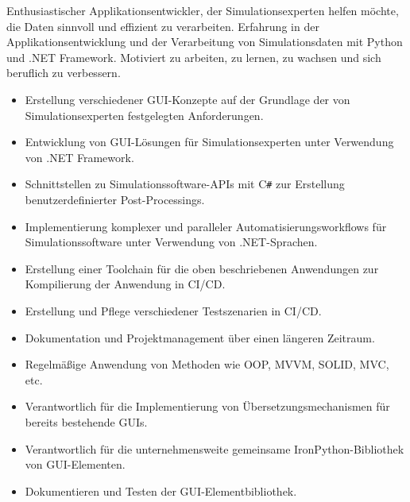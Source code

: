 \documentclass[10pt,a4paper,ragged2e,withhyper]{altacv}
\begin{document}
\begin{paracol}{2}

\begin{flushleft}
Enthusiastischer Applikationsentwickler, der Simulationsexperten helfen möchte, die Daten sinnvoll und effizient zu verarbeiten. 
Erfahrung in der Applikationsentwicklung und der Verarbeitung von Simulationsdaten mit Python und .NET Framework. 
Motiviert zu arbeiten, zu lernen, zu wachsen und sich beruflich zu verbessern.
\end{flushleft}

\begin{itemize}
\item Erstellung verschiedener GUI-Konzepte auf der Grundlage der von Simulationsexperten festgelegten Anforderungen.
\item Entwicklung von GUI-Lösungen für Simulationsexperten unter Verwendung von .NET Framework.
\item Schnittstellen zu Simulationssoftware-APIs mit C\verb|#| zur Erstellung benutzerdefinierter Post-Processings.
\item Implementierung komplexer und paralleler Automatisierungsworkflows für Simulationssoftware unter Verwendung von .NET-Sprachen.
\item Erstellung einer Toolchain für die oben beschriebenen Anwendungen zur Kompilierung der Anwendung in CI/CD.
\item Erstellung und Pflege verschiedener Testszenarien in CI/CD.
\item Dokumentation und Projektmanagement über einen längeren Zeitraum.
\item Regelmäßige Anwendung von Methoden wie OOP, MVVM, SOLID, MVC, etc.  
\end{itemize}
\divider
{}
\begin{itemize}
\item Verantwortlich für die Implementierung von Übersetzungsmechanismen für bereits bestehende GUIs. 
\item Verantwortlich für die unternehmensweite gemeinsame IronPython-Bibliothek von GUI-Elementen.
\item Dokumentieren und Testen der GUI-Elementbibliothek.
\end{itemize}
\divider


\end{paracol}
\end{document}
